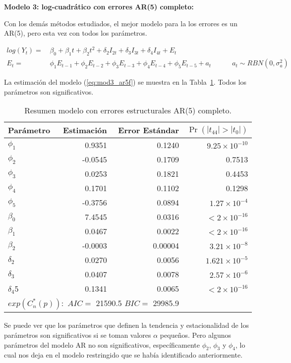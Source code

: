 \documentclass[11pt, letterpaper, twoside]{article}
\begin{document}
\textbf{Modelo 3: log-cuadrático con errores AR(5) completo:}

Con los demás métodos estudiados, el mejor modelo para la los errores es un AR(5), pero esta vez con todos los parámetros.

\begin{align}
\label{eq:mod3_ar5f}
    log(Y_t) = & \, \beta_0 + \beta_1 t + \beta_2 t^2 + \delta_2 I_{2t} + \delta_3 I_{3t} + \delta_4 I_{4t} + E_t \\
    E_t = & \, \phi_1 E_{t-1} + \phi_2 E_{t-2} + \phi_3 E_{t-3} + \phi_4 E_{t-4} + \phi_5 E_{t-5} + a_t \quad \qquad a_t \sim RBN(0,\sigma_a^2) \nonumber
\end{align}

La estimación del modelo (\ref{eq:mod3_ar5f}) se muestra en la Tabla~\ref{tab:mod3_ar5f}. Todos los parámetros son significativos.

\begin{table}
\caption{Resumen modelo con errores estructurales AR(5) completo.}
\label{tab:mod3_ar5f}
\centering
\begin{tabular}{lrrr}
Parámetro & Estimación & Error Estándar & $\Pr(|t_{44}| > |t_0|)$ \\
  \hline
  $\phi_1$ & 0.9351 & 0.1240 & $9.25\times10^{-10}$ \\
    $\phi_2$ & -0.0545 & 0.1709 & 0.7513 \\
      $\phi_3$ & 0.0253 & 0.1821 & 0.4453 \\
        $\phi_4$ & 0.1701 & 0.1102 & 0.1298 \\
    $\phi_5$ & -0.3756 & 0.0894 & $1.27\times10^{-4}$ \\
$\beta_0$ & 7.4545 & 0.0316 & $< 2\times10^{-16}$ \\
 $\beta_1$ & 0.0467 & 0.0022 &  $< 2\times10^{-16}$\\
 $\beta_2$ & -0.0003 & 0.00004 & $3.21\times10^{-8}$ \\
  $\delta_2$  & 0.0270 & 0.0056 & $1.621\times10^{-5}$ \\
  $\delta_3$ & 0.0407 & 0.0078 & $2.57\times10^{-6}$ \\
 $\delta_4$5 & 0.1341 & 0.0065 & $< 2\times10^{-16}$ \\
   \hline
   \multicolumn{3}{l}{$exp(C_n^*(p)):$ $AIC=$ 21590.5 $BIC=$ 29985.9} & \\
    \hline
\end{tabular}
\end{table}

Se puede ver que los parámetros que definen la tendencia y estacionalidad de los parámetros son significativos si se toman valores $\alpha$ pequeños. Pero algunos parámetros del modelo AR no son significativos, específicamente $\phi_2$, $\phi_3$ y $\phi_4$, lo cual nos deja en el modelo restringido que se había identificado anteriormente.
\end{document}
